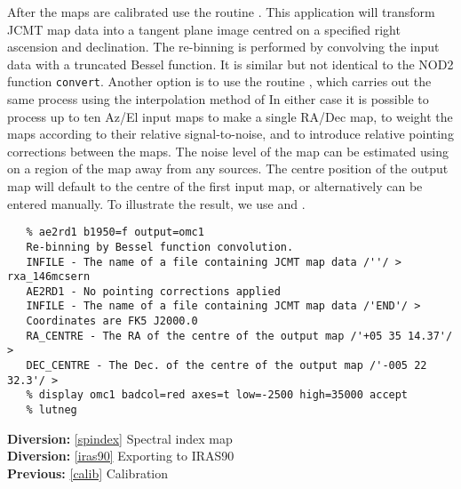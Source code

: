    After the maps are calibrated use the routine
{\tt {}}.
   This application will transform JCMT map data into a tangent plane
   image centred on a specified right ascension and declination. The
   re-binning is performed by convolving the input data with a truncated
   Bessel function. It is similar but not identical to the NOD2 function
   {\tt convert}. Another option is to use the routine
{\tt {}},
   which carries out the same process using the interpolation method of
   In either case it is possible to process up to ten
   Az/El input maps to make a single RA/Dec map, to weight the maps according
   to their relative signal-to-noise, and to introduce relative pointing
   corrections between the maps. The noise level of the map can be
   estimated using
{\tt {}}
   on a region of the map away from any
   sources. The centre position of the output map will default to the
   centre of the first input map, or alternatively can be entered
   manually. To illustrate
   the result, we use
{\tt {}}
   and
{\tt {}}.

\begin{verbatim}
   % ae2rd1 b1950=f output=omc1
   Re-binning by Bessel function convolution.
   INFILE - The name of a file containing JCMT map data /''/ > rxa_146mcsern
   AE2RD1 - No pointing corrections applied
   INFILE - The name of a file containing JCMT map data /'END'/ > 
   Coordinates are FK5 J2000.0
   RA_CENTRE - The RA of the centre of the output map /'+05 35 14.37'/ > 
   DEC_CENTRE - The Dec. of the centre of the output map /'-005 22 32.3'/ >
   % display omc1 badcol=red axes=t low=-2500 high=35000 accept
   % lutneg
\end{verbatim}

\begin{latexonly}
\begin{center}
\leavevmode\epsfysize=80mm
\end{center}
\end{latexonly}

\begin{latexonly}
{\bf Diversion:} \ref{spindex} Spectral index map\\
{\bf Diversion:} \ref{iras90} Exporting to IRAS90\\
{\bf Previous:} \ref{calib} Calibration\\
\end{latexonly}

